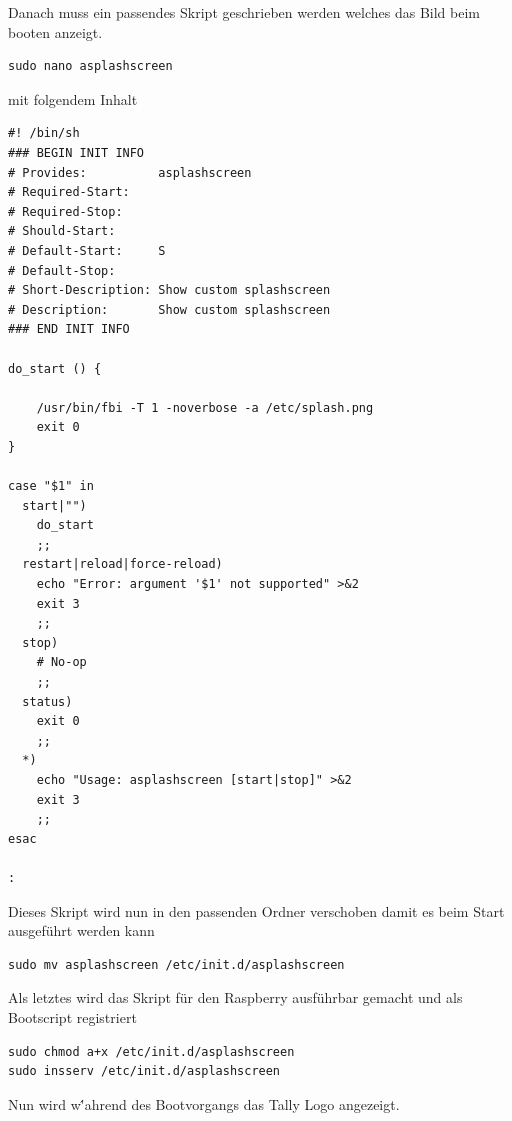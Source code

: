 \documentclass[11pt,a4paper]{article} %
\begin{document}
Danach muss ein passendes Skript geschrieben werden welches das Bild beim booten anzeigt.
\begin{frame}

\begin{lstlisting}
sudo nano asplashscreen
\end{lstlisting}

\end{frame}
\newpage
mit folgendem Inhalt
\begin{frame}

\begin{lstlisting}
#! /bin/sh
### BEGIN INIT INFO
# Provides:          asplashscreen
# Required-Start:
# Required-Stop:
# Should-Start:      
# Default-Start:     S
# Default-Stop:
# Short-Description: Show custom splashscreen
# Description:       Show custom splashscreen
### END INIT INFO
 
do_start () {
 
    /usr/bin/fbi -T 1 -noverbose -a /etc/splash.png    
    exit 0
}
 
case "$1" in
  start|"")
    do_start
    ;;
  restart|reload|force-reload)
    echo "Error: argument '$1' not supported" >&2
    exit 3
    ;;
  stop)
    # No-op
    ;;
  status)
    exit 0
    ;;
  *)
    echo "Usage: asplashscreen [start|stop]" >&2
    exit 3
    ;;
esac
 
:
\end{lstlisting}

\end{frame}

Dieses Skript wird nun in den passenden Ordner verschoben damit es beim Start ausgeführt werden kann
\begin{frame}

\begin{lstlisting}
sudo mv asplashscreen /etc/init.d/asplashscreen
\end{lstlisting}
\end{frame}

Als letztes wird das Skript für den Raspberry ausführbar gemacht und als Bootscript registriert
\begin{frame}

\begin{lstlisting}
sudo chmod a+x /etc/init.d/asplashscreen
sudo insserv /etc/init.d/asplashscreen
\end{lstlisting}
\end{frame}

Nun wird w\''ahrend des Bootvorgangs das Tally Logo angezeigt.
\newpage
\end{document}
